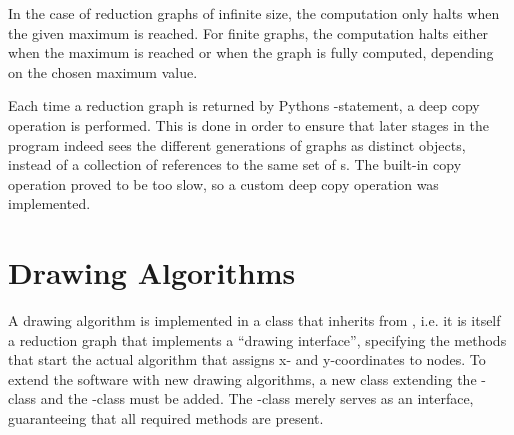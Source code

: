 In the case of reduction graphs of infinite size, the computation only halts
when the given maximum is reached. For finite graphs, the computation halts
either when the maximum is reached or when the graph is fully computed,
depending on the chosen maximum value.

Each time a reduction graph is returned by Pythons -statement, a
deep copy operation is performed. This is done in order to ensure that later
stages in the program indeed sees the different generations of graphs as
distinct objects, instead of a collection of references to the same set of
s. The built-in copy operation  proved to
be too slow, so a custom deep copy operation was implemented.

\section{Drawing Algorithms}

A drawing algorithm is implemented in a class that inherits from
, i.e. it is itself a reduction graph that implements a
``drawing interface'', specifying the methods that start the actual algorithm
that assigns x- and y-coordinates to nodes. To extend the software with new
drawing algorithms, a new class extending the -class and the
-class must be added. The
-class merely serves as an interface, guaranteeing
that all required methods are present.


